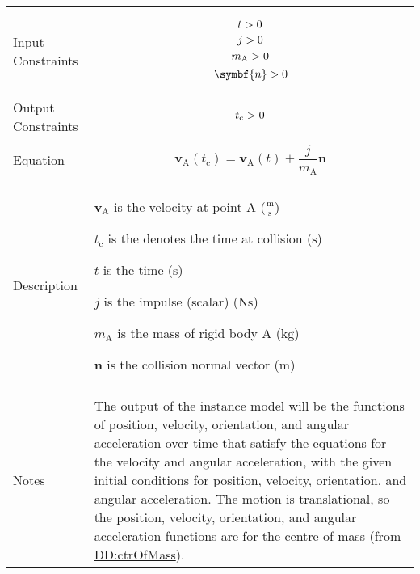 \documentclass[12pt]{article}
\newcommand{\gt}{\ensuremath >}
\begin{document}
\begin{minipage}{\textwidth}
\begin{tabular}{>{\raggedright}p{}>{\raggedright\arraybackslash}p{}}
\\ \midrule \\
Input Constraints & \begin{displaymath}
                    t\gt{}0
                    \end{displaymath}
                    \begin{displaymath}
                    j\gt{}0
                    \end{displaymath}
                    \begin{displaymath}
                    {m_{\text{A}}}\gt{}0
                    \end{displaymath}
                    \begin{displaymath}
                    \symbf{n}\gt{}0
                    \end{displaymath}
\\ \midrule \\
Output Constraints & \begin{displaymath}
                     {t_{\text{c}}}\gt{}0
                     \end{displaymath}
\\ \midrule \\
Equation & \begin{displaymath}
           {\symbf{v}_{\text{A}}}\left({t_{\text{c}}}\right)={\symbf{v}_{\text{A}}}\left(t\right)+\frac{j}{{m_{\text{A}}}} \symbf{n}
           \end{displaymath}
\\ \midrule \\
Description & \begin{symbDescription}
              \item{${\symbf{v}_{\text{A}}}$ is the velocity at point A ($\frac{\text{m}}{\text{s}}$)}
              \item{${t_{\text{c}}}$ is the denotes the time at collision (${\text{s}}$)}
              \item{$t$ is the time (${\text{s}}$)}
              \item{$j$ is the impulse (scalar) ($\text{N}\text{s}$)}
              \item{${m_{\text{A}}}$ is the mass of rigid body A (${\text{kg}}$)}
              \item{$\symbf{n}$ is the collision normal vector (${\text{m}}$)}
              \end{symbDescription}
\\ \midrule \\
Notes & The output of the instance model will be the functions of position, velocity, orientation, and angular acceleration over time that satisfy the equations for the velocity and angular acceleration, with the given initial conditions for position, velocity, orientation, and angular acceleration. The motion is translational, so the position, velocity, orientation, and angular acceleration functions are for the centre of mass (from \hyperref[DD:ctrOfMass]{DD:ctrOfMass}).
        

\end{tabular}
\end{minipage}
\end{document}
